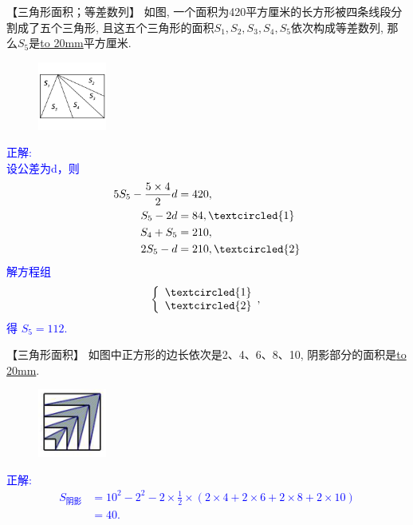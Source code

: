 \item {
    【三角形面积；等差数列】
    如图, 一个面积为420平方厘米的长方形被四条线段分割成了五个三角形, 且这五个三角形的面积$S_1, S_2, S_3, S_4, S_5$依次构成等差数列, 那么$S_5$是\underline{\hbox to 20mm{}}平方厘米.
    \begin{figure}[H] 
        \centering
        \includegraphics[width=0.2\textwidth]{./pics/Chapter_2/16.png}
    \end{figure}
    \ifshowSolution 
        \fangsong{}\textcolor{blue}{
            正解: \\
            设公差为d，则 
            \begin{align*}
                5S_{5} - \frac{5\times 4}{2}d &= 420, \\
                S_{5} - 2d &= 84, \textcircled{1} \\
                S_{4} + S_{5} &= 210, \\
                2S_{5} - d &= 210, \textcircled{2} \\
            \end{align*}
            解方程组
            \[\left\{
                \begin{array}{l}
                    \textcircled{1} \\ 
                    \textcircled{2} 
                \end{array},
            \right.\]
            得 $S_{5}=112.$
        }
    \else
        \vspace{1cm}
    \fi
}

\item {
    【三角形面积】
    如图中正方形的边长依次是2、4、6、8、10, 阴影部分的面积是\underline{\hbox to 20mm{}}.
    \begin{figure}[H] 
        \centering
        \includegraphics[width=0.2\textwidth]{./pics/Chapter_2/17.png}
    \end{figure}
    \ifshowSolution 
        \fangsong{}\textcolor{blue}{
            正解: \\
            \begin{align*}
                S_{阴影} &= 10^2 - 2^2 - 2\times \frac12\times (2\times 4 + 2\times 6 + 2\times 8 + 2\times 10) \\
                &= 40.
            \end{align*}
        }
    \else
        \vspace{1cm}
    \fi
}

